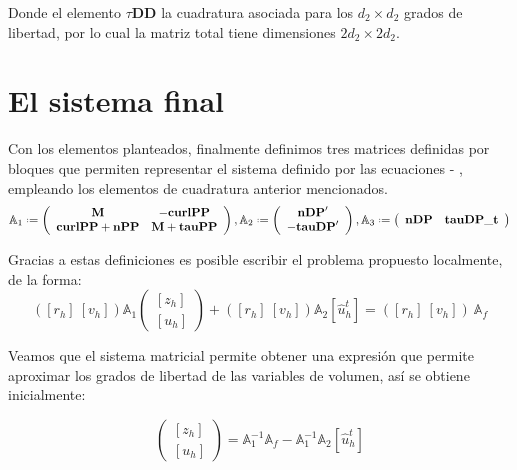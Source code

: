 \documentclass{article}
\begin{document}
\noindent Donde el elemento $\tau \mathbf{DD}$ la cuadratura asociada para los $d_2 \times d_2$ grados de libertad, por lo cual la matriz total tiene dimensiones $2d_2 \times 2d_2$.

\section{El sistema final}

\noindent Con los elementos planteados, finalmente definimos tres matrices definidas por bloques que permiten representar el sistema definido por las ecuaciones  - , empleando los elementos de cuadratura anterior mencionados.
\begin{align}
    \mathbb{A}_1 \defeq 
    \left (
    \begin{array}{cc}
        \mathbf{M} & -\mathbf{curlPP} \\
        \mathbf{curlPP} + \mathbf{nPP} & \mathbf{M} + \mathbf{tauPP}
    \end{array}
    \right ),
        \mathbb{A}_2 \defeq 
    \left (
    \begin{array}{cc}
        \mathbf{nDP}' \\
        -\mathbf{tauDP}'
    \end{array}
    \right ), 
        \mathbb{A}_3 \defeq 
    \left (
    \begin{array}{cc}
        \mathbf{nDP} & \mathbf{tauDP\_t}
    \end{array}
    \right )
\end{align}

\noindent Gracias a estas definiciones es posible escribir el problema propuesto localmente, de la forma:
\begin{equation*}
    \left ( [r_h]~[v_h] \right )
    \mathbb{A}_1 
    \left(
    \begin{array}{cc}
        {[z_h]} \\
        {[u_h]}
    \end{array}
    \right )
    + \left ( [r_h] ~ [v_h] \right )
    \mathbb{A}_2 [\hat{u}^t_h] 
    = \left ( [r_h] ~ [v_h] \right )~\mathbb{A}_f 
\end{equation*}

\noindent Veamos que el sistema matricial permite obtener una expresión que permite aproximar los grados de libertad  de las variables de volumen, así se obtiene inicialmente:

\begin{equation*}
	\left( \begin{array}{cc}{[z_h]} \\ {[u_h]} \end{array} \right ) 
	=
	\mathbb{A}_1^{-1} \mathbb{A}_f - \mathbb{A}_1^{-1} \mathbb{A}_2  [\hat{u}^t_h] 
\end{equation*}
\end{document}
